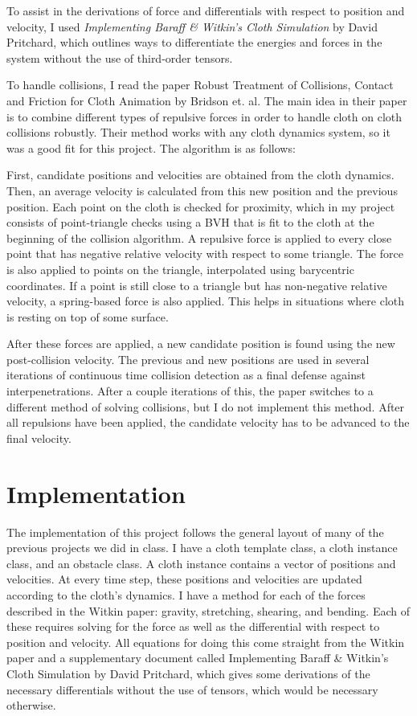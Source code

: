 \documentclass[12pt]{article} %
\begin{document}
To assist in the derivations of force and differentials with respect to position and velocity, I used \textit{Implementing Baraff \& Witkin's Cloth Simulation} by David Pritchard, which outlines ways to differentiate the energies and forces in the system without the use of third-order tensors. 

To handle collisions, I read the paper Robust Treatment of Collisions, Contact and Friction for Cloth Animation by Bridson et. al. The main idea in their paper is to combine different types of repulsive forces in order to handle cloth on cloth collisions robustly. Their method works with any cloth dynamics system, so it was a good fit for this project. The algorithm is as follows:

First, candidate positions and velocities are obtained from the cloth dynamics. Then, an average velocity is calculated from this new position and the previous position. Each point on the cloth is checked for proximity, which in my project consists of point-triangle checks using a BVH that is fit to the cloth at the beginning of the collision algorithm. A repulsive force is applied to every close point that has negative relative velocity with respect to some triangle. The force is also applied to points on the triangle, interpolated using barycentric coordinates. If a point is still close to a triangle but has non-negative relative velocity, a spring-based force is also applied. This helps in situations where cloth is resting on top of some surface.

After these forces are applied, a new candidate position is found using the new post-collision velocity. The previous and new positions are used in several iterations of continuous time collision detection as a final defense against interpenetrations. After a couple iterations of this, the paper switches to a different method of solving collisions, but I do not implement this method. After all repulsions have been applied, the candidate velocity has to be advanced to the final velocity.

\section{Implementation}
The implementation of this project follows the general layout of many of the previous projects we did in class. I have a cloth template class, a cloth instance class, and an obstacle class. A cloth instance contains a vector of positions and velocities. At every time step, these positions and velocities are updated according to the cloth’s dynamics. I have a method for each of the forces described in the Witkin paper: gravity, stretching, shearing, and bending. Each of these requires solving for the force as well as the differential with respect to position and velocity. All equations for doing this come straight from the Witkin paper and a supplementary document called Implementing Baraff \& Witkin’s Cloth Simulation by David Pritchard, which gives some derivations of the necessary differentials without the use of tensors, which would be necessary otherwise.
\end{document}

